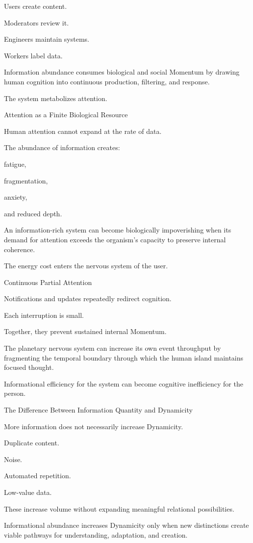 Users create content.

Moderators review it.

Engineers maintain systems.

Workers label data.

Information abundance consumes biological and social Momentum by drawing human cognition into continuous production, filtering, and response.

The system metabolizes attention.

Attention as a Finite Biological Resource

Human attention cannot expand at the rate of data.

The abundance of information creates:

fatigue,

fragmentation,

anxiety,

and reduced depth.

An information-rich system can become biologically impoverishing when its demand for attention exceeds the organism’s capacity to preserve internal coherence.

The energy cost enters the nervous system of the user.

Continuous Partial Attention

Notifications and updates repeatedly redirect cognition.

Each interruption is small.

Together, they prevent sustained internal Momentum.

The planetary nervous system can increase its own event throughput by fragmenting the temporal boundary through which the human island maintains focused thought.

Informational efficiency for the system can become cognitive inefficiency for the person.

The Difference Between Information Quantity and Dynamicity

More information does not necessarily increase Dynamicity.

Duplicate content.

Noise.

Automated repetition.

Low-value data.

These increase volume without expanding meaningful relational possibilities.

Informational abundance increases Dynamicity only when new distinctions create viable pathways for understanding, adaptation, and creation.

